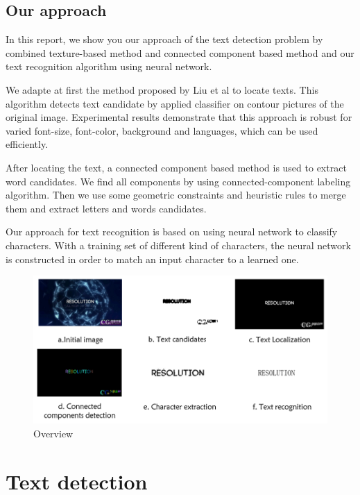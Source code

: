 \documentclass[paper=a4, french, 11pt]{scrartcl}
\begin{document}
\subsection{Our approach} \mbox{} \vspace{-0.5cm}

In this report, we show you our approach of the text detection problem by combined texture-based method and connected component based method and our text recognition algorithm using neural network. 

We adapte at first the method proposed by Liu et al \cite{liu2005text} to locate texts. This algorithm detects text candidate by applied classifier on contour pictures of the original image. Experimental results demonstrate that this approach is robust for varied font-size, font-color, background and languages, which can be used efficiently.

After locating the text, a connected component based method is used to extract word candidates. We find all components by using connected-component labeling algorithm. Then we use some geometric constraints and heuristic rules to merge them and extract letters and words candidates.  

Our approach for text recognition is based on using neural network to classify characters. With a training set of different kind of characters, the neural network is constructed in order to match an input character to a learned one. 


\begin{figure}[h]
\begin{center}
	\vspace{-1ex}
   \includegraphics[width=0.9\linewidth]{process.png}
\end{center}
\vspace{-4ex}
\caption{Overview}
\label{fig:heatmap}
\end{figure}

\section{Text detection} \mbox{} \vspace{-0.5cm}
\end{document}
